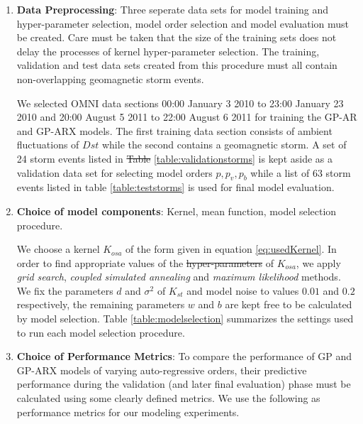\documentclass{article}
\providecommand{\DIFadd}[1]{{\protect\color{blue}\uwave{#1}}} %
\providecommand{\DIFdel}[1]{{\protect\color{red}\sout{#1}}}                      %
\providecommand{\DIFaddbegin}{} %
\providecommand{\DIFaddend}{} %
\providecommand{\DIFdelbegin}{} %
\providecommand{\DIFdelend}{} %
\newcommand{\DIFscaledelfig}{0.5}
\newlength{\DIFdelgraphicswidth} %
\newlength{\DIFdelgraphicsheight} %
\newcommand{\DIFaddincludegraphics}[2][]{{\color{blue}\fbox{\DIFOincludegraphics[#1]{#2}}}} %
\newcommand{\DIFdelincludegraphics}[2][]{%
\sbox{\DIFdelgraphicsbox}{\DIFOincludegraphics[#1]{#2}}%
\settoboxwidth{\DIFdelgraphicswidth}{\DIFdelgraphicsbox} %
\settoboxtotalheight{\DIFdelgraphicsheight}{\DIFdelgraphicsbox} %
\scalebox{\DIFscaledelfig}{%
\parbox[b]{\DIFdelgraphicswidth}{\usebox{\DIFdelgraphicsbox}\\[-\baselineskip] \rule{\DIFdelgraphicswidth}{0em}}\llap{\resizebox{\DIFdelgraphicswidth}{\DIFdelgraphicsheight}{%
\setlength{\unitlength}{\DIFdelgraphicswidth}%
\begin{picture}(1,1)%
\thicklines\linethickness{2pt} %
{\color[rgb]{1,0,0}\put(0,0){\framebox(1,1){}}}%
{\color[rgb]{1,0,0}\put(0,0){\line( 1,1){1}}}%
{\color[rgb]{1,0,0}\put(0,1){\line(1,-1){1}}}%
\end{picture}%
}\hspace*{3pt}}} %
} %
\DeclareRobustCommand{\DIFaddbegin}{\DIFOaddbegin \let\includegraphics\DIFaddincludegraphics} %
\DeclareRobustCommand{\DIFaddend}{\DIFOaddend \let\includegraphics\DIFOincludegraphics} %
\DeclareRobustCommand{\DIFdelbegin}{\DIFOdelbegin \let\includegraphics\DIFdelincludegraphics} %
\DeclareRobustCommand{\DIFdelend}{\DIFOaddend \let\includegraphics\DIFOincludegraphics} %
\begin{document}
\begin{enumerate}

\item \textbf{Data Preprocessing}: Three seperate data sets for model training and hyper-parameter selection, model order selection and model evaluation must be created. Care must be taken that the size of the training sets does not delay the processes of kernel hyper-parameter selection. The training, validation and test data sets created from this procedure must all contain non-overlapping geomagnetic storm events. 

  We selected OMNI data sections 00:00 January 3 2010 to 23:00 January 23 2010 and 20:00 August 5 2011 to 22:00 August 6 2011 for training the GP-AR and GP-ARX models. The first training data section consists of ambient fluctuations of $Dst$ while the second contains a geomagnetic storm. A set of 24 storm events listed in \DIFdelbegin \DIFdel{Table }\DIFdelend \DIFaddbegin \DIFadd{table }\DIFaddend \ref{table:validationstorms} is kept aside as a validation data set for selecting model orders $p, p_v, p_b$ while a list of 63 storm events listed in table \ref{table:teststorms} is used for final model evaluation.


\item \textbf{Choice of model components}:  Kernel, mean function, model selection procedure. 

  We choose a kernel $K_{osa}$ of the form given in equation \ref{eq:usedKernel}. In order to find appropriate values of the \DIFdelbegin \DIFdel{hyper-parameters }\DIFdelend \DIFaddbegin \DIFadd{hyperparameters }\DIFaddend of $K_{osa}$, we apply \emph{grid search}, \emph{coupled simulated annealing} and \emph{maximum likelihood} methods. We fix the parameters $d$ and $\sigma^2$ of $K_{st}$ and model noise to values $0.01$ and $0.2$ respectively, the remaining parameters $w$ and $b$ are kept free to be calculated by model selection. Table \ref{table:modelselection} summarizes the settings used to run each model selection procedure.

\item \textbf{Choice of Performance Metrics}: To compare the performance of GP and GP-ARX models of varying auto-regressive orders, their predictive performance during the validation (and later final evaluation) phase must be calculated using some clearly defined metrics. We use the following as performance metrics for our modeling experiments.


\end{enumerate}
\end{document}
